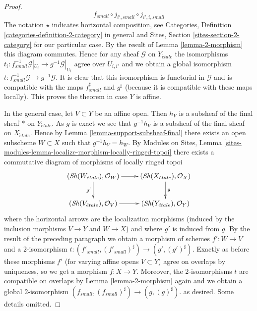 \documentclass[10pt,a4paper]{amsart}
\theoremstyle{plain}
\theoremstyle{definition}
\theoremstyle{remark}
\numberwithin{equation}{subsection}
\def\Sh{\mathop{\mathit{Sh}}\nolimits}
\def\etale{{\acute{e}tale}}
\begin{document}
\begin{proof}
$${f_{small} \circ j_{i', small} \circ j_{i', i, small}
}
$$
The notation $\star$ indicates horizontal composition, see
Categories, Definition \ref{categories-definition-2-category}
in general and
Sites, Section \ref{sites-section-2-category}
for our particular case. By the result of
Lemma \ref{lemma-2-morphism}
this diagram commutes. Hence for any sheaf $\mathcal{G}$
on $Y_\etale$ the isomorphisms
$t_i : f_{small}^{-1}\mathcal{G}|_{U_i} \to g^{-1}\mathcal{G}|_{U_i}$
agree over $U_{i, i'}$ and we obtain a global isomorphism
$t : f_{small}^{-1}\mathcal{G} \to g^{-1}\mathcal{G}$.
It is clear that this isomorphism is functorial in $\mathcal{G}$
and is compatible with the maps $f_{small}^\sharp$ and $g^\sharp$
(because it is compatible with these maps locally).
This proves the theorem in case $Y$ is affine.

\medskip\noindent
In the general case, let $V \subset Y$ be an affine open.
Then $h_V$ is a subsheaf of the final sheaf $*$ on $Y_\etale$.
As $g$ is exact we see that $g^{-1}h_V$ is a subsheaf of the final
sheaf on $X_\etale$. Hence by
Lemma \ref{lemma-support-subsheaf-final}
there exists an open subscheme $W \subset X$ such that $g^{-1}h_V = h_W$. By
Modules on Sites,
Lemma \ref{sites-modules-lemma-localize-morphism-locally-ringed-topoi}
there exists a commutative diagram of morphisms of locally ringed
topoi
$$
\xymatrix{
(\Sh(W_\etale), \mathcal{O}_W) \ar[r] \ar[d]_{g'} &
(\Sh(X_\etale), \mathcal{O}_X) \ar[d]^g \\
(\Sh(V_\etale), \mathcal{O}_V) \ar[r] &
(\Sh(Y_\etale), \mathcal{O}_Y)
}
$$
where the horizontal arrows are the localization morphisms
(induced by the inclusion morphisms $V \to Y$ and $W \to X$)
and where $g'$ is induced from $g$. By the result of the preceding
paragraph we obtain a morphism of schemes $f' : W \to V$ and
a $2$-isomorphism
$t : (f'_{small}, (f'_{small})^\sharp) \to (g', (g')^\sharp)$.
Exactly as before these morphisms $f'$ (for varying affine opens $V \subset Y$)
agree on overlaps by uniqueness, so we get a morphism $f : X \to Y$.
Moreover, the $2$-isomorphisms $t$ are compatible on overlaps by
Lemma \ref{lemma-2-morphism}
again and we obtain a global $2$-isomorphism
$(f_{small}, (f_{small})^\sharp) \to (g, (g)^\sharp)$.
as desired. Some details omitted.
\end{proof}
\end{document}

